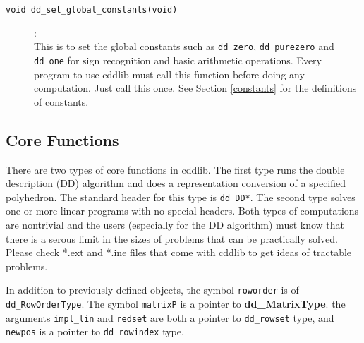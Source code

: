 \documentclass[11pt]{article}
\newcommand {\0} {{\bf 0}}
\begin{document}
\begin{description}

\item[{\tt void dd\_set\_global\_constants(void)}]:\\
This is to set the global constants such as {\tt dd\_zero},
{\tt dd\_purezero} and
{\tt dd\_one} for sign recognition and basic arithmetic
operations.  {Every program to use cddlib must call this function}
before doing any computation.    Just call this once.
 See Section \ref{constants} for the definitions of
constants.

\end{description}

\subsection{Core Functions}  \label{CoreLibrary}

There are two types of core functions in cddlib.  The first type
runs the double description (DD) algorithm and does a representation
conversion of a specified polyhedron.  The standard header
for this type is {\tt dd\_DD*}.  The second type solves
one or more linear programs with no special headers.   
Both types of computations are nontrivial
and the users (especially for the DD algorithm) must
know that there is a serous limit in the sizes of problems
that can be practically solved. 
Please check *.ext and *.ine files that come with cddlib to get
ideas of tractable problems. 

In addition to previously defined objects, the symbol  {\tt roworder} is
of {\tt dd\_RowOrderType}. The symbol {\tt matrixP} is 
a pointer to {\bf dd\_MatrixType}.
the arguments {\tt impl\_lin} and {\tt redset} are both a pointer 
to {\tt dd\_rowset} type, and {\tt newpos} is a pointer to 
{\tt dd\_rowindex} type. 
\end{document}
